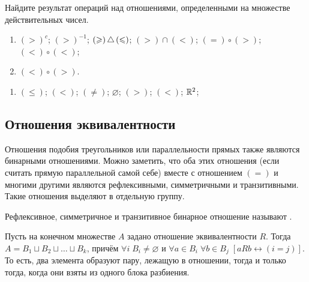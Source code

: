 \begin{Exercise}[counter=SecExercise]
    \noindent
    Найдите результат операций над отношениями, определенными на множестве действительных чисел.
    \begin{enumerate}[label=\textbf{\alph*)}]
        \item $ (>)^c $;
        \inlineitem $ (>)^{-1} $;
        \inlineitem $ (\geqslant) \,\triangle\, (\leqslant) $;
        \inlineitem $ (>) \cap (<) $;
        \inlineitem $ (=) \circ (>) $;
        \inlineitem $ (<) \circ (<) $;
        \item $ (<) \circ (>) $.
    \end{enumerate}
\end{Exercise}

\begin{Answer}
    \noindent
    \begin{enumerate}[label=\textbf{\alph*)}]
        \item $ (\leqslant) $;
        \inlineitem $ (<) $;
        \inlineitem $ (\neq) $;
        \inlineitem $ \varnothing $;
        \inlineitem $ (>) $;
        \inlineitem $ (<) $;
        \inlineitem $ \mathbb{R}^2 $;
    \end{enumerate}
\end{Answer}


\subsection{Отношения эквивалентности}
\label{subsec:binary_relations:equivalency}

Отношения подобия треугольников или параллельности прямых также являются бинарными отношениями.
Можно заметить, что оба этих отношения (если считать прямую параллельной самой себе)
вместе с отношением $ (=) $ и многими другими являются рефлексивными, симметричными и транзитивными.
Такие отношения выделяют в отдельную группу.

\begin{definition}
    Рефлексивное, симметричное и транзитивное бинарное отношение называют .
\end{definition}

\begin{theorem}
    \label{theorem:binary_relations:eq_classes_partition}
    Пусть на конечном множестве $ A $ задано отношение эквивалентности $ R $.
    Тогда $ A = B_1 \sqcup B_2 \sqcup \ldots \sqcup B_k $,
    причём $ \forall i \; B_i \neq \varnothing $ и $ \forall a \in B_i \; \forall b \in B_j \; \left[ a R b \leftrightarrow (i = j) \right] $.
    То есть, два элемента образуют пару, лежащую в отношении, тогда и только тогда, когда они взяты из одного блока разбиения.
\end{theorem}


